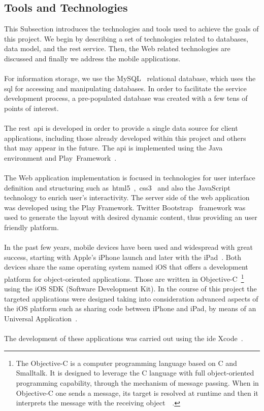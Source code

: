 \subsection{Tools and Technologies}
\label{subsec:ttbuipd}
This Subsection introduces the technologies and tools used to achieve the goals of this project. We begin by describing a set of technologies related to databases, data model, and the \gls{rest} service. Then, the Web related technologies are discussed and finally we address the mobile applications.\\
\\
For information storage, we use the MySQL~\cite{MySqlOrcale} relational database, which uses the \gls{sql} for accessing and manipulating databases. In order to facilitate the service development process, a pre-populated database was created with a few tens of points of interest.\\
\\
The \gls{rest}~\gls{api} is developed in order to provide a single data source for client applications, including those already developed within this project and others that may appear in the future. The \gls{api} is implemented using the Java environment and Play~Framework~\cite{playFramework}.\\
\\
The Web application implementation is focused in technologies for user interface definition and structuring such as~\gls{html5}~\cite{html5},~\gls{css3}~\cite{css3} and also the JavaScript~\cite{javaScript} technology to enrich user's interactivity. The server side of the web application was developed using the Play Framework. Twitter Bootstrap~\cite{twitterBootstrap} framework was used to generate the layout with desired dynamic content, thus providing an user friendly platform.\\
\\
In the past few years, mobile devices have been used and widespread with great success, starting with Apple's iPhone launch and later with the iPad~\cite{iPadSanchez}. Both devices share the same operating system named iOS that offers a development platform for object-oriented applications. Those are written in Objective-C~\cite{ObjectiveC}\footnote{The Objective-C is a computer programming language based on C and Smalltalk. It is designed to leverage the C language with full object-oriented programming capability, through the mechanism of message passing. When in Objective-C one sends a message, its target is resolved at runtime and then it interprets the message with the receiving object~\cite{ObjectiveC}~\cite{objectiveCBook}.} using the iOS SDK (Software Development Kit). In the course of this project the targeted applications were designed taking into consideration advanced aspects of the iOS platform such as sharing code between iPhone and iPad, by means of an Universal Application~\cite{UniversalApps}.\\
\\
The development of these applications was carried out using the \gls{ide} Xcode~\cite{Xcode}.

